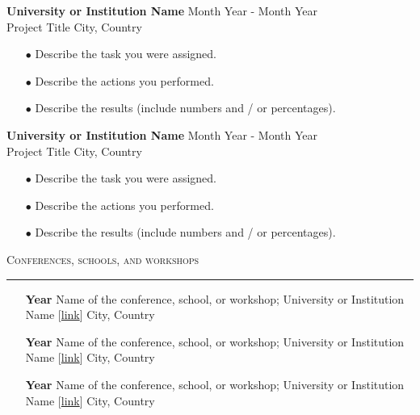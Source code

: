 \documentclass[letterpaper, 11pt]{article}
\begin{document}

\textbf{University or Institution Name} \hfill Month Year - Month Year\\
Project Title \hfill City, Country
\begin{itemize}[leftmargin = *, noitemsep, topsep = 1 pt]
    \item[$\bullet$] Describe the task you were assigned.
    \item[$\bullet$] Describe the actions you performed.
    \item[$\bullet$] Describe the results (include numbers and / or percentages).
\end{itemize}

\vspace{1.00 ex}

\textbf{University or Institution Name} \hfill Month Year - Month Year\\
Project Title \hfill City, Country
\begin{itemize}[leftmargin = *, noitemsep, topsep = 1 pt]
    \item[$\bullet$] Describe the task you were assigned.
    \item[$\bullet$] Describe the actions you performed.
    \item[$\bullet$] Describe the results (include numbers and / or percentages).
\end{itemize}

\vspace{1.00 ex}

\textsc{Conferences, schools, and workshops}
\vspace{1.00 ex}
\hrule


\begin{itemize}[noitemsep, topsep = 0pt]
    \item[\textbf{Year}] Name of the conference, school, or workshop; University or Institution Name [\href{https://www.harvard.edu/}{link}] \hfill City, Country

    \item[\textbf{Year}] Name of the conference, school, or workshop; University or Institution Name [\href{https://www.harvard.edu/}{link}] \hfill City, Country

    \item[\textbf{Year}] Name of the conference, school, or workshop; University or Institution Name [\href{https://www.harvard.edu/}{link}] \hfill City, Country
\end{itemize}
\end{document}
